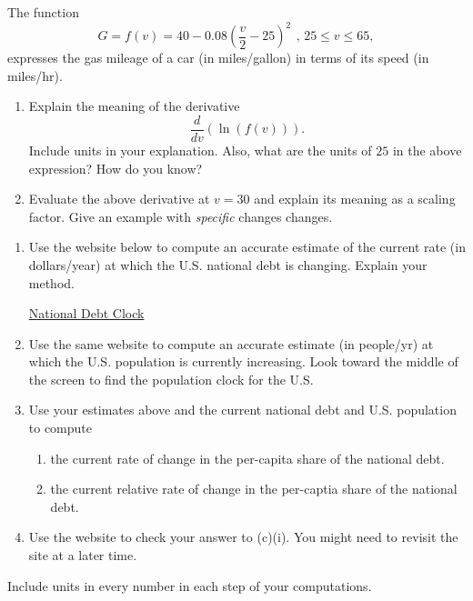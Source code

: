 \documentclass{ximera}
\begin{document}
\begin{question}  \label{Q3fdsf4thmm}
The function 
\[ 
      G = f(v) = 40-0.08\left(\frac{v}{2}-25\right)^{2}\, \ , \, 25\leq v\leq 65 ,
\]
expresses the gas mileage of a car (in miles/gallon) in terms of its speed (in miles/hr).

\begin{enumerate}
\item Explain the meaning of the derivative 
\[
     \frac{d}{dv} \left( \ln (f(v)) \right) .
\]
Include units in your explanation. Also, what are the units of $25$ in the above expression? How do you know?

\item Evaluate the above derivative at $v=30$ and explain its meaning as a scaling factor. Give an example with \emph{specific} changes changes.
\end{enumerate}
\end{question}

\begin{question}  \label{Qdr34gggtre}
\begin{enumerate}
\item Use the website below to compute an accurate estimate of the current rate (in dollars/year) at which the U.S. national debt is changing. Explain your method. 

\href{https://www.usdebtclock.org/}{National Debt Clock}

\item Use the same website to compute an accurate estimate (in people/yr) at which the U.S. population is currently increasing. Look toward the middle of the screen to find the population clock for the U.S.


\item Use your estimates above and the current national debt and U.S. population to compute

\begin{enumerate}
   \item the current rate of change in the per-capita share of the national debt.

    \item the current relative rate of change in the per-captia share of the national debt.
\end{enumerate}

\item Use the website to check your answer to (c)(i). You might need to revisit the site at a later time.
\end{enumerate} 

Include units in every number in each step of your computations.

\end{question}
\end{document}
